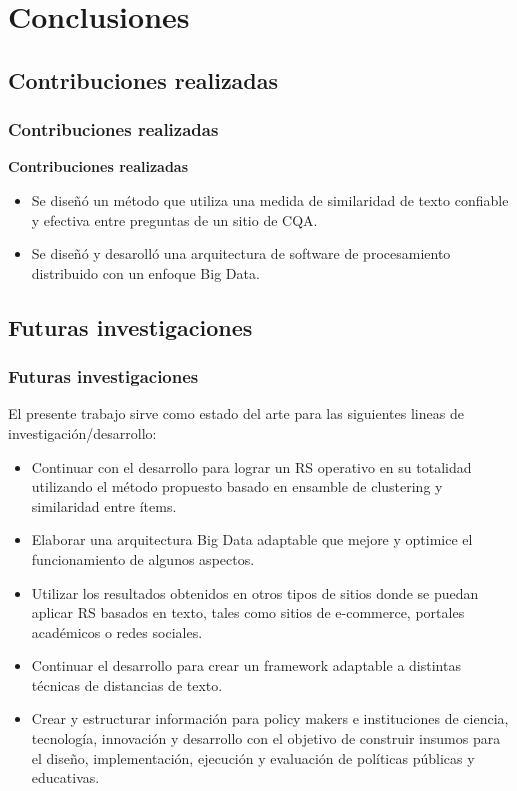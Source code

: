 \section{Conclusiones}

\subsection{Contribuciones realizadas}
\begin{frame}
	\frametitle{Contribuciones realizadas}
	\textbf{Contribuciones realizadas}
	\bigskip

	\begin{itemize}
		\item Se diseñó un método que utiliza una medida de similaridad de texto confiable y efectiva entre preguntas de un sitio de CQA.
		\bigskip
		\item Se diseñó y desarolló una arquitectura de software de procesamiento distribuido con un enfoque Big Data.
	\end{itemize}
\end{frame}

\subsection{Futuras investigaciones}
\begin{frame}
	\frametitle{Futuras investigaciones}
	El presente trabajo sirve como estado del arte para las siguientes lineas de investigación/desarrollo:
	\bigskip

	\begin{footnotesize}
		\footnotesize
			\begin{itemize}
				\item Continuar con el desarrollo para lograr un RS operativo en su totalidad utilizando el método propuesto basado en ensamble de clustering y similaridad entre ítems.
				\item Elaborar una arquitectura Big Data adaptable que mejore y optimice el funcionamiento de algunos aspectos.
				\item Utilizar los resultados obtenidos en otros tipos de sitios donde se puedan aplicar RS basados en texto, tales como sitios de e-commerce, portales académicos o redes sociales.
				\item Continuar el desarrollo para crear un framework adaptable a distintas técnicas de distancias de texto.
				\item Crear y estructurar información para policy makers e instituciones de ciencia, tecnología, innovación y desarrollo con el objetivo de construir insumos para el diseño, implementación, ejecución y evaluación de políticas públicas y educativas.
			\end{itemize}
	\end{footnotesize}
\end{frame}